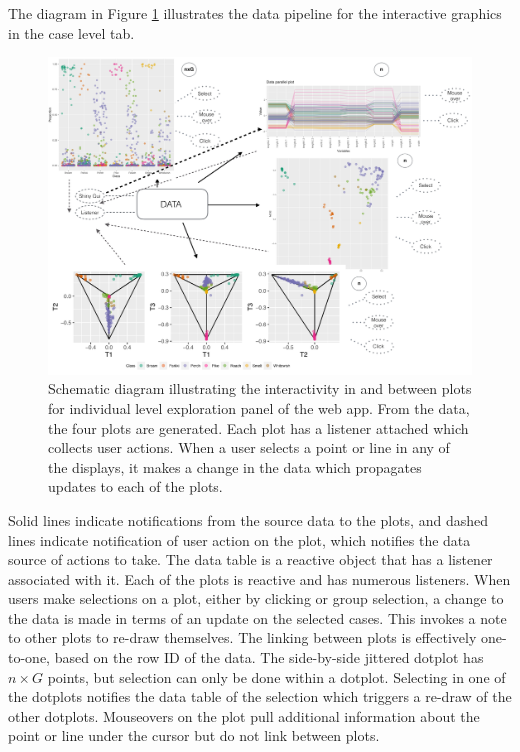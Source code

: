 \documentclass[smallextended,natbib]{svjour3}\usepackage[]{graphicx}\usepackage[]{xcolor}
\begin{document}
The diagram in Figure \ref{tab1diag} illustrates the data pipeline \citep{BAHM88,wickham2009plumbing} for the interactive graphics in the case level tab.
\begin{figure}[hbpt]
\centering
\includegraphics[width=1\linewidth]{fishT1.pdf}
\caption{Schematic diagram illustrating the interactivity in and between plots for individual level exploration panel of the web app. From the data, the four plots are generated. Each plot has a listener attached which collects user actions. When a user selects a point or line in any of the displays, it makes a change in the data which propagates updates to each of the plots.}
\label{tab1diag}
\end{figure}
Solid lines indicate notifications from the source data to the plots, and dashed lines indicate notification of user action on the plot, which notifies the data source of actions to take. The data table is a reactive object that has a listener associated with it. Each of the plots is reactive and has numerous listeners. When users make selections on a plot, either by clicking or group selection, a change to the data is made in terms of an update on the selected cases. This invokes a note to other plots to re-draw themselves. The linking between plots is effectively one-to-one, based on the row ID of the data. The side-by-side jittered dotplot has $n\times G$ points, but selection can only be done within a dotplot. Selecting in one of the dotplots notifies the data table of the selection which triggers a re-draw of the other dotplots. Mouseovers on the plot pull additional information about the point or line under the cursor but do not link between plots.
\end{document}
